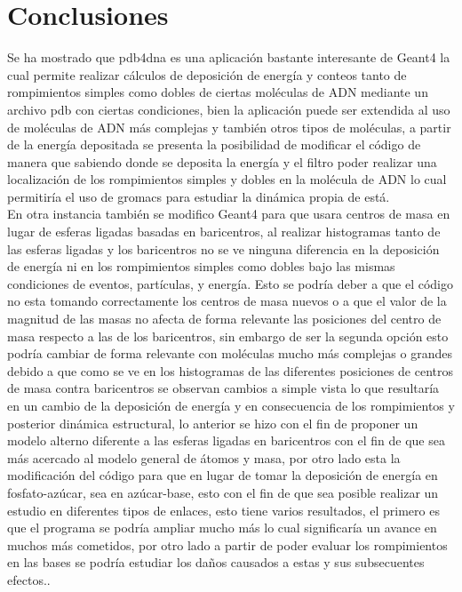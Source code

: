 \clearpage
\section{Conclusiones}
\label{sec:res}
Se ha mostrado que pdb4dna es una aplicación bastante interesante de Geant4 la cual permite realizar cálculos de deposición de energía y conteos tanto de rompimientos simples como dobles de ciertas moléculas de ADN mediante un archivo pdb con ciertas condiciones, bien la aplicación puede ser extendida al uso de moléculas de ADN más complejas y también otros tipos de moléculas, a partir de la energía depositada se presenta la posibilidad de modificar el código de manera que sabiendo donde se deposita la energía y el filtro poder realizar una localización de los rompimientos simples y dobles en la molécula de ADN lo cual permitiría el uso de gromacs para estudiar la dinámica propia de está.\\
En otra instancia también se modifico Geant4 para que usara centros de masa en lugar de esferas ligadas basadas en baricentros, al realizar histogramas tanto de las esferas ligadas y los baricentros no se ve ninguna diferencia en la deposición de energía ni en los rompimientos simples como dobles bajo las mismas condiciones de eventos, partículas, y energía. Esto se podría deber a que el código no esta tomando correctamente los centros de masa nuevos o a que el valor de la magnitud de las masas no afecta de forma relevante las posiciones del centro de masa respecto a las de los baricentros, sin embargo de ser la segunda opción esto podría cambiar de forma relevante con moléculas mucho más complejas o grandes debido a que como se ve en los histogramas de las diferentes posiciones de centros de masa contra baricentros se observan cambios a simple vista lo que resultaría en un cambio de la deposición de energía y en consecuencia de los rompimientos y posterior dinámica estructural, lo anterior se hizo con el fin de proponer un modelo alterno diferente a las esferas ligadas en baricentros con el fin de que sea más acercado al modelo general de átomos y masa, por otro lado esta la modificación del código para que en lugar de tomar la deposición de energía en fosfato-azúcar, sea en azúcar-base, esto con el fin de que sea posible realizar un estudio en diferentes tipos de enlaces, esto tiene varios resultados, el primero es que el programa se podría ampliar mucho más lo cual significaría un avance en muchos más cometidos, por otro lado a partir de poder evaluar los rompimientos en las bases se podría estudiar los daños causados a estas y sus subsecuentes efectos..
